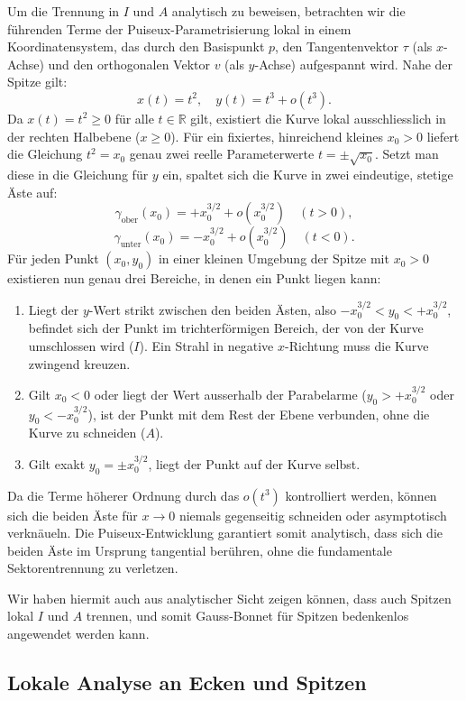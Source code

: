 Um die Trennung in $I$ und $A$ analytisch zu beweisen, betrachten wir die führenden Terme der Puiseux-Parametrisierung lokal in einem Koordinatensystem, das durch den Basispunkt $p$, den Tangentenvektor $\tau$ (als $x$-Achse) und den orthogonalen Vektor $v$ (als $y$-Achse) aufgespannt wird. Nahe der Spitze gilt:
\[
    x(t) = t^2, \quad y(t) = t^3 + o(t^3).
\]
Da $x(t) = t^2 \ge 0$ für alle $t \in \mathbb{R}$ gilt, existiert die Kurve lokal ausschliesslich in der rechten Halbebene ($x \ge 0$).
Für ein fixiertes, hinreichend kleines $x_0 > 0$ liefert die Gleichung $t^2 = x_0$ genau zwei reelle Parameterwerte $t = \pm\sqrt{x_0}$.
Setzt man diese in die Gleichung für $y$ ein, spaltet sich die Kurve in zwei eindeutige, stetige Äste auf:
\[
    \gamma_{\text{ober}}(x_0) = +x_0^{3/2} + o(x_0^{3/2}) \quad (t > 0),
\]
\[
    \gamma_{\text{unter}}(x_0) = -x_0^{3/2} + o(x_0^{3/2}) \quad (t < 0).
\]
Für jeden Punkt $(x_0, y_0)$ in einer kleinen Umgebung der Spitze mit $x_0 > 0$ existieren nun genau drei Bereiche, in denen ein Punkt liegen kann:
\begin{enumerate}
    \item Liegt der $y$-Wert strikt zwischen den beiden Ästen, also $-x_0^{3/2} < y_0 < +x_0^{3/2}$, befindet sich der Punkt im trichterförmigen Bereich, der von der Kurve umschlossen wird ($I$). Ein Strahl in negative $x$-Richtung muss die Kurve zwingend kreuzen.
    \item Gilt $x_0 < 0$ oder liegt der Wert ausserhalb der Parabelarme ($y_0 > +x_0^{3/2}$ oder $y_0 < -x_0^{3/2}$), ist der Punkt mit dem Rest der Ebene verbunden, ohne die Kurve zu schneiden ($A$).
    \item Gilt exakt $y_0 = \pm x_0^{3/2}$, liegt der Punkt auf der Kurve selbst.
\end{enumerate}
Da die Terme höherer Ordnung durch das $o(t^3)$ kontrolliert werden, können sich die beiden Äste für $x \to 0$ niemals gegenseitig schneiden oder asymptotisch verknäueln. Die Puiseux-Entwicklung garantiert somit analytisch, dass sich die beiden Äste im Ursprung tangential berühren, ohne die fundamentale Sektorentrennung zu verletzen.

Wir haben hiermit auch aus analytischer Sicht zeigen können, dass auch Spitzen lokal $I$ und $A$ trennen, und somit Gauss-Bonnet für Spitzen bedenkenlos angewendet werden kann.

\subsection{Lokale Analyse an Ecken und Spitzen}

